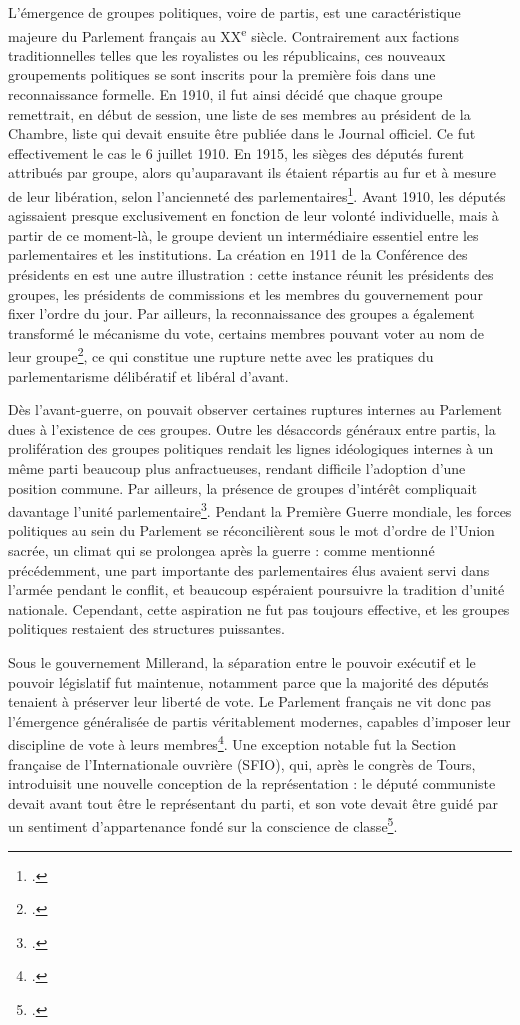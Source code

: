 \documentclass[a4paper,twoside,12pt]{book}
\begin{document}
L'émergence de groupes politiques, voire de partis, est une caractéristique majeure du Parlement français au XX\textsuperscript{e} siècle. Contrairement aux factions traditionnelles telles que les royalistes ou les républicains, ces nouveaux groupements politiques se sont inscrits pour la première fois dans une reconnaissance formelle. En 1910, il fut ainsi décidé que chaque groupe remettrait, en début de session, une liste de ses membres au président de la Chambre, liste qui devait ensuite être publiée dans le Journal officiel. Ce fut effectivement le cas le 6 juillet 1910. En 1915, les sièges des députés furent attribués par groupe, alors qu'auparavant ils étaient répartis au fur et à mesure de leur libération, selon l'ancienneté des parlementaires\footcite[p.218]{morel2024}. Avant 1910, les députés agissaient presque exclusivement en fonction de leur volonté individuelle, mais à partir de ce moment-là, le groupe devient un intermédiaire essentiel entre les parlementaires et les institutions. La création en 1911 de la Conférence des présidents en est une autre illustration : cette instance réunit les présidents des groupes, les présidents de commissions et les membres du gouvernement pour fixer l'ordre du jour. Par ailleurs, la reconnaissance des groupes a également transformé le mécanisme du vote, certains membres pouvant voter au nom de leur groupe\footcite[p.219]{morel2024}, ce qui constitue une rupture nette avec les pratiques du parlementarisme délibératif et libéral d'avant.

Dès l'avant-guerre, on pouvait observer certaines ruptures internes au Parlement dues à l'existence de ces groupes. Outre les désaccords généraux entre partis, la prolifération des groupes politiques rendait les lignes idéologiques internes à un même parti beaucoup plus anfractueuses, rendant difficile l'adoption d'une position commune. Par ailleurs, la présence de groupes d'intérêt compliquait davantage l'unité parlementaire\footcite[p.220]{morel2024}. Pendant la Première Guerre mondiale, les forces politiques au sein du Parlement se réconcilièrent sous le mot d'ordre de l'Union sacrée, un climat qui se prolongea après la guerre : comme mentionné précédemment, une part importante des parlementaires élus avaient servi dans l'armée pendant le conflit, et beaucoup espéraient poursuivre la tradition d'unité nationale. Cependant, cette aspiration ne fut pas toujours effective, et les groupes politiques restaient des structures puissantes.

Sous le gouvernement Millerand, la séparation entre le pouvoir exécutif et le pouvoir législatif fut maintenue, notamment parce que la majorité des députés tenaient à préserver leur liberté de vote. Le Parlement français ne vit donc pas l'émergence généralisée de partis véritablement modernes, capables d'imposer leur discipline de vote à leurs membres\footcite[p.342]{zotero-515}. Une exception notable fut la Section française de l'Internationale ouvrière (SFIO), qui, après le congrès de Tours, introduisit une nouvelle conception de la représentation : le député communiste devait avant tout être le représentant du parti, et son vote devait être guidé par un sentiment d'appartenance fondé sur la conscience de classe\footcite[p.238]{morel2024}.
\end{document}
